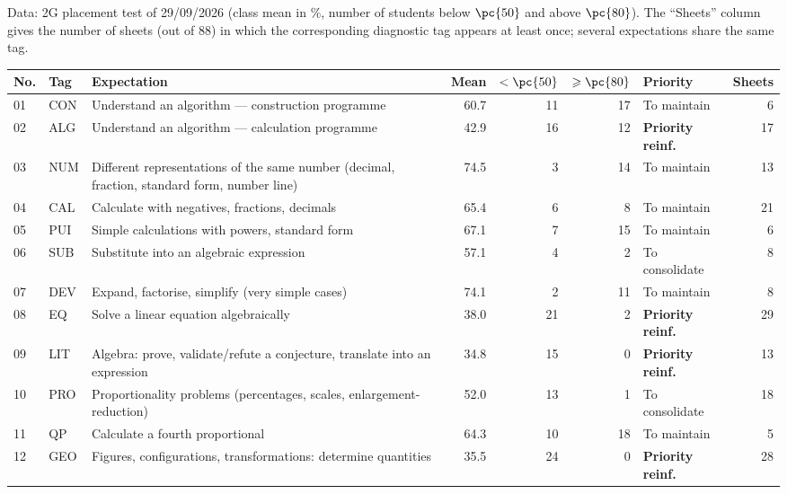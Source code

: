 Data: 2G placement test of 29/09/2026 (class mean in \%, number of students below $\pc{50}$ and above $\pc{80}$). The ``Sheets'' column gives the number of sheets (out of $88$) in which the corresponding diagnostic tag appears at least once; several expectations share the same tag.\par\smallskip
{\footnotesize{}\begin{tabular}{@{}l l p{7.1cm} r r r l r@{}}\toprule
No. & Tag & Expectation & Mean & $<\pc{50}$ & $\geqslant\pc{80}$ & Priority & Sheets \\ \midrule
01 & CON & Understand an algorithm — construction programme & \num{60,7} & 11 & 17 & To maintain & 6 \\
02 & ALG & Understand an algorithm — calculation programme & \num{42,9} & 16 & 12 & \textbf{Priority reinf.} & 17 \\
03 & NUM & Different representations of the same number (decimal, fraction, standard form, number line) & \num{74,5} & 3 & 14 & To maintain & 13 \\
04 & CAL & Calculate with negatives, fractions, decimals & \num{65,4} & 6 & 8 & To maintain & 21 \\
05 & PUI & Simple calculations with powers, standard form & \num{67,1} & 7 & 15 & To maintain & 6 \\
06 & SUB & Substitute into an algebraic expression & \num{57,1} & 4 & 2 & To consolidate & 8 \\
07 & DEV & Expand, factorise, simplify (very simple cases) & \num{74,1} & 2 & 11 & To maintain & 8 \\
08 & EQ & Solve a linear equation algebraically & \num{38,0} & 21 & 2 & \textbf{Priority reinf.} & 29 \\
09 & LIT & Algebra: prove, validate/refute a conjecture, translate into an expression & \num{34,8} & 15 & 0 & \textbf{Priority reinf.} & 13 \\
10 & PRO & Proportionality problems (percentages, scales, enlargement-reduction) & \num{52,0} & 13 & 1 & To consolidate & 18 \\
11 & QP & Calculate a fourth proportional & \num{64,3} & 10 & 18 & To maintain & 5 \\
12 & GEO & Figures, configurations, transformations: determine quantities & \num{35,5} & 24 & 0 & \textbf{Priority reinf.} & 28 \\

\end{tabular}}
